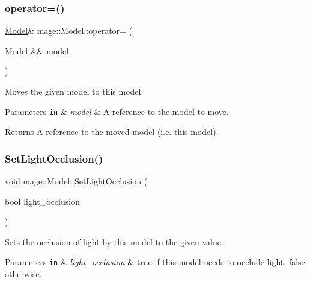 \subsubsection{\texorpdfstring{operator=()}{operator=()}\hspace{0.1cm}{\footnotesize\ttfamily [2/2]}}
{\footnotesize\ttfamily \hyperlink{classmage_1_1_model}{Model}\& mage\+::\+Model\+::operator= (\begin{DoxyParamCaption}\item[{\hyperlink{classmage_1_1_model}{Model} \&\&}]{model }\end{DoxyParamCaption})\hspace{0.3cm}{\ttfamily [delete]}}

Moves the given model to this model.


\begin{DoxyParams}[1]{Parameters}
\mbox{\tt in}  & {\em model} & A reference to the model to move. \\
\hline
\end{DoxyParams}
\begin{DoxyReturn}{Returns}
A reference to the moved model (i.\+e. this model). 
\end{DoxyReturn}
\hypertarget{classmage_1_1_model_aabcd12eeab9d6b81e27c727cb94cf57a}{}\label{classmage_1_1_model_aabcd12eeab9d6b81e27c727cb94cf57a} 
\subsubsection{\texorpdfstring{Set\+Light\+Occlusion()}{SetLightOcclusion()}}
{\footnotesize\ttfamily void mage\+::\+Model\+::\+Set\+Light\+Occlusion (\begin{DoxyParamCaption}\item[{bool}]{light\+\_\+occlusion }\end{DoxyParamCaption})\hspace{0.3cm}{\ttfamily [noexcept]}}

Sets the occlusion of light by this model to the given value.


\begin{DoxyParams}[1]{Parameters}
\mbox{\tt in}  & {\em light\+\_\+occlusion} & {\ttfamily true} if this model needs to occlude light. {\ttfamily false} otherwise. \\
\hline
\end{DoxyParams}
\hypertarget{classmage_1_1_model_a684886e1f43cdc6ebd5c52f9437f9869}{}\label{classmage_1_1_model_a684886e1f43cdc6ebd5c52f9437f9869} 
